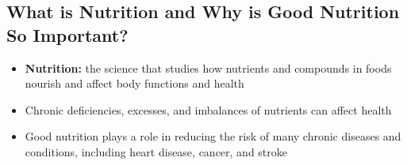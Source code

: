 \documentclass[12pt]{article}
\begin{document}
        \subsection{What is Nutrition and Why is Good Nutrition So Important?}
            \begin{itemize}
                \item \textbf{Nutrition:} the science that studies how nutrients and compounds in foods nourish and affect body functions and health
                \item Chronic deficiencies, excesses, and imbalances of nutrients can affect health
                \item Good nutrition plays a role in reducing the risk of many chronic diseases and conditions, including heart disease, cancer, and stroke
            \end{itemize}
\end{document}
